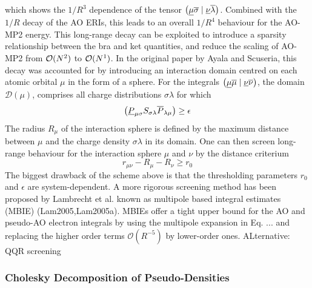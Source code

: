 \noindent which shows the $1/R^3$ dependence of the tensor $\left( \underline{\mu}\overline{\sigma} \mid \underline{\nu}\overline{\lambda} \right)$. Combined with the $1/R$ decay of the AO ERIs, this leads to an overall $1/R^4$ behaviour for the AO-MP2 energy. This long-range decay can be exploited to introduce a sparsity relationship between the bra and ket quantities, and reduce the scaling of AO-MP2 from $\mathcal{O}(N^{2})$ to $\mathcal{O}(N^{1})$. In the original paper by Ayala and Scuseria, this decay was accounted for by introducing an interaction domain centred on each atomic orbital $\mu$ in the form of a sphere. For the integrals $\left( \underline{\mu}\overline{\mu} \mid \underline{\nu}\overline{\nu} \right)$, the domain $\mathcal{D}(\mu)$, comprises all charge distributions $\sigma\lambda$ for which 
\begin{equation}
\left( \underline{P}_{\mu\sigma} S_{\sigma\lambda} \overline{P}_{\lambda\mu} \right) \geq \epsilon 
\end{equation}
\noindent The radius $R_{\mu}$ of the interaction sphere is defined by the maximum distance between $\mu$ and the charge density $\sigma\lambda$ in its domain. One can then screen long-range behaviour for the interaction sphere $\mu$ and $\nu$ by the distance criterium
\begin{equation}
r_{\mu\nu} - R_{\mu} - R_{\nu} \geq r_0
\end{equation}
\noindent The biggest drawback of the scheme above is that the thresholding parameters $r_0$ and $\epsilon$ are system-dependent. 
A more rigorous screening method has been proposed by Lambrecht et al. known as multipole based integral estimates (MBIE) (Lam2005,Lam2005a). MBIEs offer a tight upper bound for the AO and pseudo-AO electron integrals by using the multipole expansion in Eq. ... and replacing the higher order terms $\mathcal{O}(R^{-5})$ by lower-order ones. 
ALternative: QQR screening


\subsubsection{Cholesky Decomposition of Pseudo-Densities}

